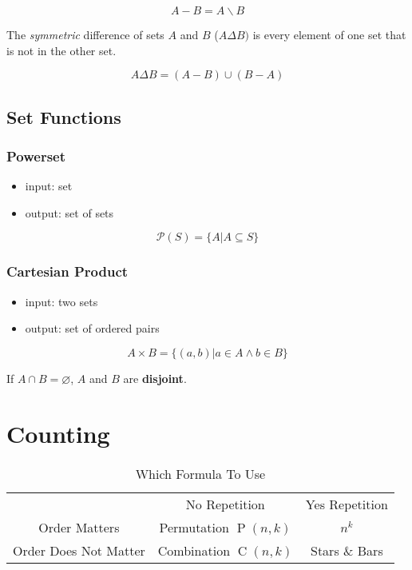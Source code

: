 \documentclass{report}
\DeclareMathOperator{\comb}{C}
\DeclareMathOperator{\perm}{P}
\newcommand{\powerset}{\mathcal{P}}
\begin{document}
\begin{equation}
    A - B = A \backslash B
\end{equation}

The \emph{symmetric} difference of sets $A$ and $B$ ($A \Delta B)$ is every element of one set that is not in the other set.

\begin{equation}
    A \Delta B = (A - B) \cup (B - A)
\end{equation}

\section{Set Functions}

\subsection{Powerset}
\begin{itemize}
    \item input: set
    \item output: set of sets
\end{itemize}

\begin{equation}
    \powerset(S) = \{A \vert A \subseteq S\}
\end{equation}

\subsection{Cartesian Product}
\begin{itemize}
    \item input: two sets
    \item output: set of ordered pairs
\end{itemize}

\begin{equation}
    A \times B = \{(a, b) | a \in A \wedge b \in B \}
\end{equation}

If $A \cap B = \varnothing$, $A$ and $B$ are \textbf{disjoint}.

\chapter{Counting}

\begin{table}[H]
    \centering
    \begin{tabular}{ccc}
         &  No Repetition& Yes Repetition\\
         Order Matters &  Permutation $\perm(n, k)$& $n^k$\\
         Order Does Not Matter &  Combination $\comb(n, k)$ & Stars \& Bars\\
    \end{tabular}
    \caption{Which Formula To Use}
    \label{tab:placeholder}
\end{table}
\end{document}
